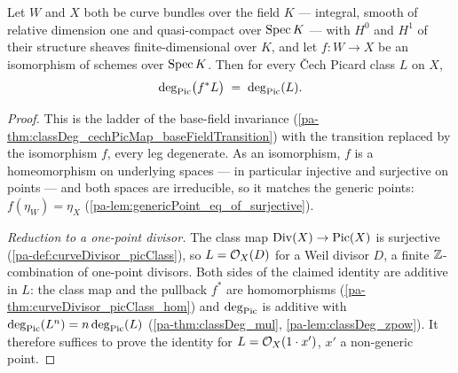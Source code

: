 \begin{theorem}
  \label{pa-thm:classDeg_cechPicMap_of_isIso}
  \leanok

  Let \(W\) and \(X\) both be curve bundles over the field \(K\) --- integral, smooth
  of relative dimension one and quasi-compact over \(\operatorname{Spec} K\) --- with \(H^0\) and
  \(H^1\) of their structure sheaves finite-dimensional over \(K\), and let
  \(f : W \to X\) be an isomorphism of schemes over \(\operatorname{Spec} K\). Then for every \v Cech
  Picard class \(L\) on \(X\),
  \[
    \deg_{\operatorname{Pic}}\bigl(f^{*}L\bigr) \;=\; \deg_{\operatorname{Pic}}(L).
  \]
\end{theorem}
\begin{proof}
  \leanok
  This is the ladder of the base-field invariance
  (\ref{pa-thm:classDeg_cechPicMap_baseFieldTransition}) with the transition replaced by
  the isomorphism \(f\), every leg degenerate. As an isomorphism, \(f\) is a
  homeomorphism on underlying spaces --- in particular injective and surjective on
  points --- and both spaces are irreducible, so it matches the generic points:
  \(f(\eta_W) = \eta_X\) (\ref{pa-lem:genericPoint_eq_of_surjective}).

  \emph{Reduction to a one-point divisor.} The class map
  \(\operatorname{Div}(X) \to \operatorname{Pic}(X)\) is surjective (\ref{pa-def:curveDivisor_picClass}), so
  \(L = \mathcal{O}_{X}(D)\) for a Weil divisor \(D\), a finite \(\mathbb{Z}\)-combination of
  one-point divisors. Both sides of the claimed identity are additive in \(L\): the
  class map and the pullback \(f^{*}\) are homomorphisms
  (\ref{pa-thm:curveDivisor_picClass_hom}) and \(\deg_{\operatorname{Pic}}\) is additive with
  \(\deg_{\operatorname{Pic}}(L^n) = n \deg_{\operatorname{Pic}}(L)\) (\ref{pa-thm:classDeg_mul},
  \ref{pa-lem:classDeg_zpow}). It therefore suffices to prove the identity for
  \(L = \mathcal{O}_{X}(1 \cdot x')\), \(x'\) a non-generic point.


\end{proof}
